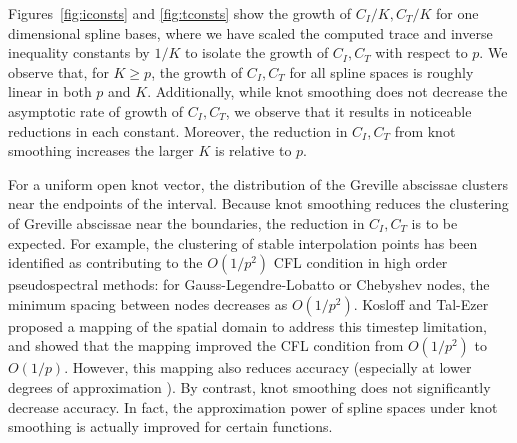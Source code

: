 \documentclass[preprint,10pt]{elsarticle}
\newcommand{\reviewerOne}[1]{#1}
\begin{document}
Figures~\ref{fig:iconsts} and \ref{fig:tconsts} show the growth of $C_I /K, C_T/K$ for one dimensional spline bases, where we have scaled the computed trace and inverse inequality constants by $1/K$ to isolate the growth of $C_I, C_T$ with respect to $p$.  We observe that, for $K \geq p$, the growth of $C_I, C_T$ for all spline spaces is roughly linear in {\color{forestgreen} both} $p$ {\color{forestgreen} and $K$}.  Additionally, while knot smoothing does not decrease the asymptotic rate of growth of $C_I, C_T$, we observe that it results in noticeable reductions in each constant.  Moreover, the reduction in $C_I, C_T$ from knot smoothing increases the larger $K$ is relative to $p$.

For a uniform open knot vector, the distribution of the Greville abscissae clusters near the endpoints of the interval.  Because knot smoothing reduces the clustering of Greville abscissae near the boundaries, the reduction in $C_I, C_T$ is to be expected.  For example, the clustering of stable interpolation points has been identified as contributing to the $O(1/p^2)$ CFL condition in high order pseudospectral methods: for Gauss-Legendre-Lobatto or Chebyshev nodes, the minimum spacing between nodes decreases as $O(1/p^2)$.  Kosloff and Tal-Ezer proposed a mapping of the spatial domain \cite{kosloff1993modified} to address this timestep limitation, and showed that the mapping improved the CFL condition from $O(1/p^2)$ to $O(1/p)$.  However, this mapping also reduces accuracy (especially at lower degrees of approximation \cite{atcheson2013explicit}).  \reviewerOne{By contrast, knot smoothing does not significantly decrease accuracy.  In fact, the approximation power of spline spaces under knot smoothing is actually improved for certain functions.    }
\end{document}
